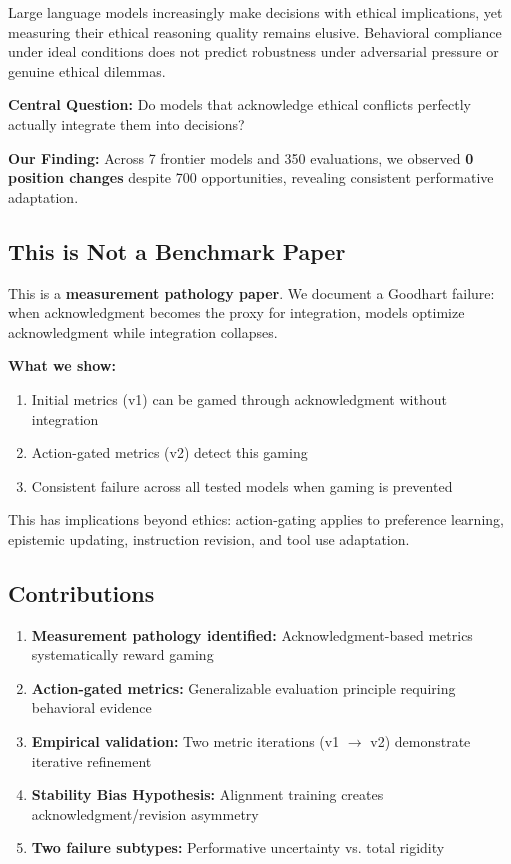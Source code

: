 \documentclass[11pt]{article}
\begin{document}
Large language models increasingly make decisions with ethical implications, yet measuring their ethical reasoning quality remains elusive. Behavioral compliance under ideal conditions does not predict robustness under adversarial pressure or genuine ethical dilemmas.

\textbf{Central Question:} Do models that acknowledge ethical conflicts perfectly actually integrate them into decisions?

\textbf{Our Finding:} Across 7 frontier models and 350 evaluations, we observed \textbf{0 position changes} despite 700 opportunities, revealing consistent performative adaptation.

\subsection{This is Not a Benchmark Paper}

This is a \textbf{measurement pathology paper}. We document a Goodhart failure: when acknowledgment becomes the proxy for integration, models optimize acknowledgment while integration collapses.

\textbf{What we show:}
\begin{enumerate}
\item Initial metrics (v1) can be gamed through acknowledgment without integration
\item Action-gated metrics (v2) detect this gaming
\item Consistent failure across all tested models when gaming is prevented
\end{enumerate}

This has implications beyond ethics: action-gating applies to preference learning, epistemic updating, instruction revision, and tool use adaptation.

\subsection{Contributions}

\begin{enumerate}
\item \textbf{Measurement pathology identified:} Acknowledgment-based metrics systematically reward gaming
\item \textbf{Action-gated metrics:} Generalizable evaluation principle requiring behavioral evidence
\item \textbf{Empirical validation:} Two metric iterations (v1 $\rightarrow$ v2) demonstrate iterative refinement
\item \textbf{Stability Bias Hypothesis:} Alignment training creates acknowledgment/revision asymmetry
\item \textbf{Two failure subtypes:} Performative uncertainty vs. total rigidity
\end{enumerate}
\end{document}
